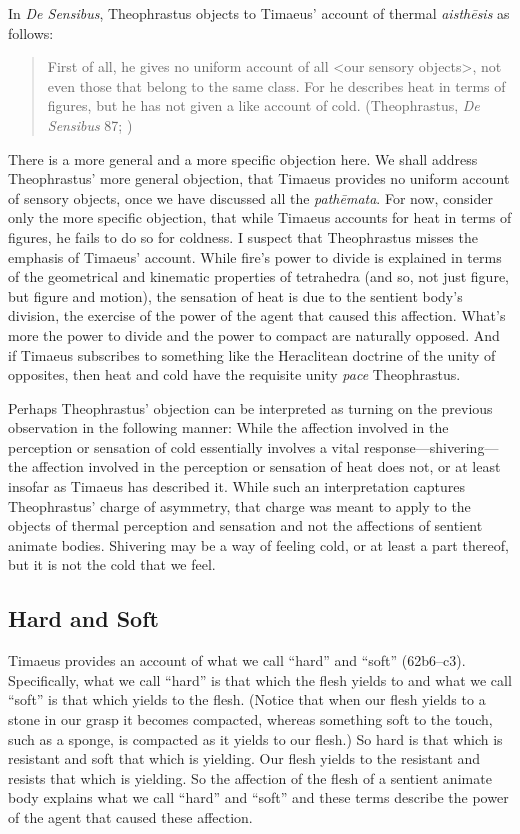 In \emph{De Sensibus}, Theophrastus objects to Timaeus' account of thermal \emph{aisthēsis} as follows:
\begin{quote}
	First of all, he gives no uniform account of all <our sensory objects>, not even those that belong to the same class. For he describes heat in terms of figures, but he has not given a like account of cold. (Theophrastus, \emph{De Sensibus} 87; \citealt[147]{Stratton:1917vn})
\end{quote}
There is a more general and a more specific objection here. We shall address Theophrastus' more general objection, that Timaeus provides no uniform account of sensory objects, once we have discussed all the \emph{pathēmata}. For now, consider only the more specific objection, that while Timaeus accounts for heat in terms of figures, he fails to do so for coldness. I suspect that Theophrastus misses the emphasis of Timaeus' account. While fire's power to divide is explained in terms of the geometrical and kinematic properties of tetrahedra (and so, not just figure, but figure and motion), the sensation of heat is due to the sentient body's division, the exercise of the power of the agent that caused this affection. What's more the power to divide and the power to compact are naturally opposed. And if Timaeus subscribes to something like the Heraclitean doctrine of the unity of opposites, then heat and cold have the requisite unity \emph{pace} Theophrastus. 

Perhaps Theophrastus' objection can be interpreted as turning on the previous observation in the following manner: While the affection involved in the perception or sensation of cold essentially involves a vital response---shivering---the affection involved in the perception or sensation of heat does not, or at least insofar as Timaeus has described it. While such an interpretation captures Theophrastus' charge of asymmetry, that charge was meant to apply to the objects of thermal perception and sensation and not the affections of sentient animate bodies. Shivering may be a way of feeling cold, or at least a part thereof, but it is not the cold that we feel.


\subsection{Hard and Soft} %
\label{sub:hard_and_soft}

Timaeus provides an account of what we call ``hard'' and ``soft'' (62b6--c3). Specifically, what we call ``hard'' is that which the flesh yields to and what we call ``soft'' is that which yields to the flesh. (Notice that when our flesh yields to a stone in our grasp it becomes compacted, whereas something soft to the touch, such as a sponge, is compacted as it yields to our flesh.) So hard is that which is resistant and soft that which is yielding. Our flesh yields to the resistant and resists that which is yielding. So the affection of the flesh of a sentient animate body explains what we call ``hard'' and ``soft'' and these terms describe the power of the agent that caused these affection.

